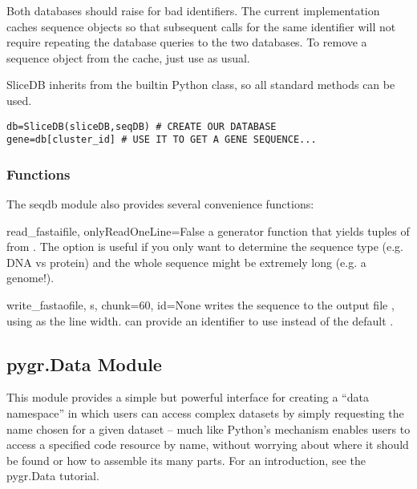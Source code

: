 \documentclass{howto}
\begin{document}
Both databases should raise  for bad identifiers.
The current  implementation caches sequence objects so
that subsequent calls for the same identifier will not require
repeating the database queries to the two databases.  To
remove a sequence object from the cache, just use
 as usual.

SliceDB inherits from the builtin Python  class,
so all standard methods can be used.

\begin{verbatim}
db=SliceDB(sliceDB,seqDB) # CREATE OUR DATABASE
gene=db[cluster_id] # USE IT TO GET A GENE SEQUENCE...
\end{verbatim}



\subsubsection{Functions}
The seqdb module also provides several convenience functions:

\begin{funcdesc}{read_fasta}{ifile, onlyReadOneLine=False}
  a generator function
  that yields tuples of  from .  
  The  option is useful if you only want to 
  determine the sequence type (e.g. DNA vs protein) and the
  whole sequence might be extremely long (e.g. a genome!).
\end{funcdesc}

\begin{funcdesc}{write_fasta}{ofile, s, chunk=60, id=None}
  writes the sequence 
  to the output file , using  as the line width.
   can provide an identifier to use instead of the default 
  .
\end{funcdesc}

\subsection{pygr.Data Module}
\label{pygrData-module}
This module provides a simple but powerful interface for creating
a ``data namespace'' in which users can access complex datasets
by simply requesting the name chosen for a given dataset -- much
like Python's  mechanism enables users to access
a specified code resource by name, without worrying about where it
should be found or how to assemble its many parts.  For an introduction,
see the pygr.Data tutorial.
\end{document}
